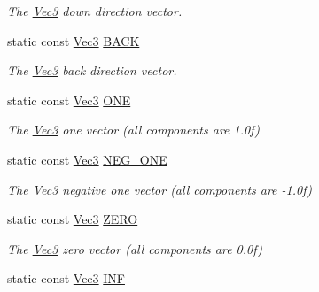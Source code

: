 \begin{DoxyCompactItemize}
\begin{DoxyCompactList}\small\item\em The \hyperlink{structgfxmath_1_1_vec3}{Vec3} down direction vector. \end{DoxyCompactList}\item 
\hypertarget{structgfxmath_1_1_vec3_a3abbcd22a86f239d8345bdcc0654fe70}{}static const \hyperlink{structgfxmath_1_1_vec3}{Vec3} \hyperlink{structgfxmath_1_1_vec3_a3abbcd22a86f239d8345bdcc0654fe70}{B\+A\+C\+K}\label{structgfxmath_1_1_vec3_a3abbcd22a86f239d8345bdcc0654fe70}

\begin{DoxyCompactList}\small\item\em The \hyperlink{structgfxmath_1_1_vec3}{Vec3} back direction vector. \end{DoxyCompactList}\item 
\hypertarget{structgfxmath_1_1_vec3_a66f3e0f49832d21f3ad8e59f3b0a5596}{}static const \hyperlink{structgfxmath_1_1_vec3}{Vec3} \hyperlink{structgfxmath_1_1_vec3_a66f3e0f49832d21f3ad8e59f3b0a5596}{O\+N\+E}\label{structgfxmath_1_1_vec3_a66f3e0f49832d21f3ad8e59f3b0a5596}

\begin{DoxyCompactList}\small\item\em The \hyperlink{structgfxmath_1_1_vec3}{Vec3} one vector (all components are 1.\+0f) \end{DoxyCompactList}\item 
\hypertarget{structgfxmath_1_1_vec3_aef5d6a224bc9f3b5cedda2a250330623}{}static const \hyperlink{structgfxmath_1_1_vec3}{Vec3} \hyperlink{structgfxmath_1_1_vec3_aef5d6a224bc9f3b5cedda2a250330623}{N\+E\+G\+\_\+\+O\+N\+E}\label{structgfxmath_1_1_vec3_aef5d6a224bc9f3b5cedda2a250330623}

\begin{DoxyCompactList}\small\item\em The \hyperlink{structgfxmath_1_1_vec3}{Vec3} negative one vector (all components are -\/1.\+0f) \end{DoxyCompactList}\item 
\hypertarget{structgfxmath_1_1_vec3_a118efe8c1f3e2b270d623a0743bbab89}{}static const \hyperlink{structgfxmath_1_1_vec3}{Vec3} \hyperlink{structgfxmath_1_1_vec3_a118efe8c1f3e2b270d623a0743bbab89}{Z\+E\+R\+O}\label{structgfxmath_1_1_vec3_a118efe8c1f3e2b270d623a0743bbab89}

\begin{DoxyCompactList}\small\item\em The \hyperlink{structgfxmath_1_1_vec3}{Vec3} zero vector (all components are 0.\+0f) \end{DoxyCompactList}\item 
\hypertarget{structgfxmath_1_1_vec3_adc0a8e147d92f5f00ed8a6f4dc3978d5}{}static const \hyperlink{structgfxmath_1_1_vec3}{Vec3} \hyperlink{structgfxmath_1_1_vec3_adc0a8e147d92f5f00ed8a6f4dc3978d5}{I\+N\+F}\label{structgfxmath_1_1_vec3_adc0a8e147d92f5f00ed8a6f4dc3978d5}


\end{DoxyCompactItemize}
